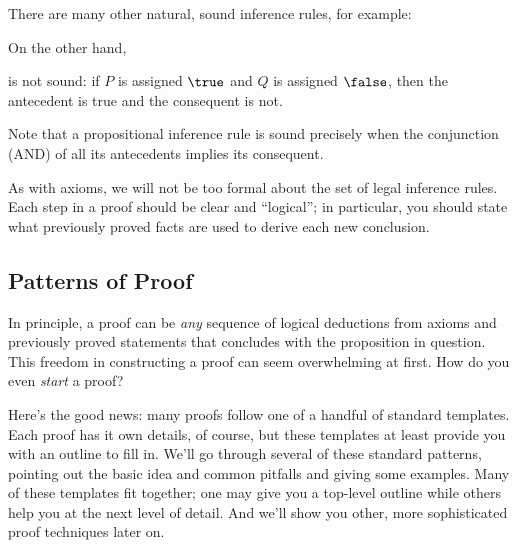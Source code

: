 There are many other natural, sound inference rules, for example:
\begin{rul*}
\end{rul*}

\begin{editingnotes}

\begin{rul*}
\end{rul*}

\end{editingnotes}

\begin{rul*}
\end{rul*}

On the other hand,
\begin{rul*}
\end{rul*}
\noindent is not sound: if $P$ is assigned $\true$ and $Q$ is assigned
$\false$, then the antecedent is true and the consequent is not.

Note that a propositional inference rule is sound precisely when the conjunction
(AND) of all its antecedents implies its consequent.

As with axioms, we will not be too formal about the set of legal inference
rules.  Each step in a proof should be clear and ``logical''; in
particular, you should state what previously proved facts are used to
derive each new conclusion.

\subsection{Patterns of Proof}

In principle, a proof can be \textit{any} sequence of logical
deductions from axioms and previously proved statements that concludes
with the proposition in question.  This freedom in constructing a
proof can seem overwhelming at first.  How do you even \textit{start}
a proof?

Here's the good news: many proofs follow one of a handful of standard
templates.  Each proof has it own details, of course, but these
templates at least provide you with an outline to fill in.  We'll go
through several of these standard patterns, pointing out the basic
idea and common pitfalls and giving some examples.  Many of these
templates fit together; one may give you a top-level outline while
others help you at the next level of detail.  And we'll show you
other, more sophisticated proof techniques later on.

